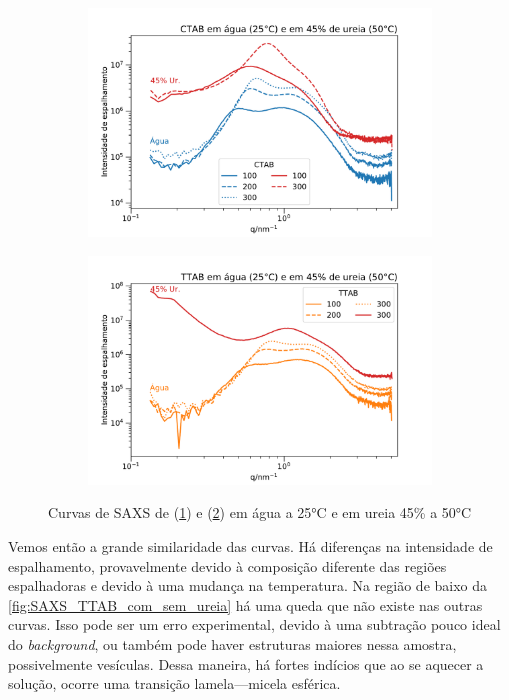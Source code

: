 	
	\begin{figure}[h]
		\begin{subfigure}[t]{0.5\textwidth}
			\centering
			\includegraphics[width=\textwidth]{./imagens/saxs/micelas_CTAB_agua_ureia}
			\caption{\CTAB}
			\label{fig:SAXS_CTAB_com_sem_ureia}
		\end{subfigure} %
		\begin{subfigure}[t]{0.5\textwidth}
			\centering
			\includegraphics[width=\textwidth]{./imagens/saxs/micelas_TTAB_agua_ureia}
			\caption{\TTAB}
			\label{fig:SAXS_TTAB_com_sem_ureia}
		\end{subfigure}
		\caption{Curvas de SAXS de \CTAB{} (\ref{fig:SAXS_CTAB_com_sem_ureia}) e \TTAB{} (\ref{fig:SAXS_TTAB_com_sem_ureia}) em água a 25°C e em ureia 45\% a 50°C}
		\label{fig:SAXS_com_sem_ureia}
	\end{figure}
	
	Vemos então a grande similaridade das curvas. Há diferenças na intensidade de espalhamento, provavelmente devido à composição diferente das regiões espalhadoras e devido à uma mudança na temperatura. Na região de baixo \q{} da \autoref{fig:SAXS_TTAB_com_sem_ureia} há uma queda que não existe nas outras curvas. Isso pode ser um erro experimental, devido à uma subtração pouco ideal do \emph{background}, ou também pode haver estruturas maiores nessa amostra, possivelmente vesículas. Dessa maneira, há fortes indícios que ao se aquecer a solução, ocorre uma transição lamela---micela esférica.
	
